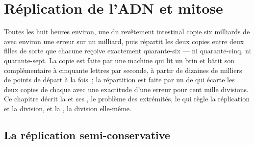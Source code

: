 \chapter{Réplication de l'ADN et mitose}\label{ch:b1:replication-mitosis}

Toutes les huit heures environ, une  du revêtement intestinal
copie six milliards de  avec environ une erreur sur un
milliard, puis répartit les deux copies entre deux filles de sorte que
chacune reçoive exactement quarante-six  --- ni
quarante-cinq, ni quarante-sept. La copie est faite par une machine qui
lit un brin et bâtit son complémentaire à cinquante lettres par seconde,
à partir de dizaines de milliers de points de départ à la fois~; la
répartition est faite par un  de  qui écarte les deux
copies de chaque  avec une exactitude d'une erreur pour cent
mille divisions. Ce chapitre décrit la  et ses
, le problème des extrémités, le  qui règle la
réplication et la division, et la , la division elle-même.

\section{La réplication semi-conservative}

